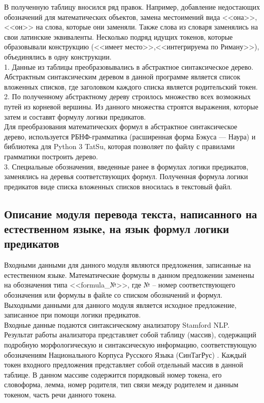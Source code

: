 \documentclass[12pt]{article}
\begin{document}
В полученную таблицу вносился ряд правок. Например, добавление недостающих обозначений для математических объектов, замена местоимений вида <<она>>,<<он>> на слова, которые они заменяли. Также слова из словаря заменялись на свои латинские эквиваленты. Несколько подряд идущих токенов, которые образовывали конструкцию (<<имеет место>>,<<интегрируема по Риману>>), объединялись в одну конструкции.\\

1. Данные из таблицы преобразовывались в абстрактное синтаксическое дерево. Абстрактным синтаксическим деревом в данной программе является список вложенных списков, где заголовком каждого списка является родительский токен. \\

2. По полученному абстрактному дереву строилось множество всех возможных путей из корневой вершины. Из данного множества строятся выражения, которые затем и составят формулу логики предикатов. \\

Для преобразования математических формул в абстрактное синтаксическое дерево, используется РБНФ-грамматика (расширенная форма Бэкуса — Наура) и библиотека для Python 3 TatSu, которая позволяет по файлу с правилами грамматики построить дерево. \\

3. Специальные обозначения, введенные ранее в формулах логики предикатов, заменялись на деревья соответствующих формул. Полученная формула логики предикатов виде списка вложенных списков вносилась в текстовый файл.  \\
 
\newpage
\subsection{Описание модуля перевода текста, написанного на естественном языке, на язык формул логики предикатов}
Входными данными для данного модуля являются предложения, записанные на естественном языке.  Математические формулы в данном предложении заменены на обозначения типа <<formula\_№>>, где № -- номер соответствующего обозначения или формулы в файле со списком обозначений и формул. Выходными данными для данного модуля является исходное предложение, записанное при помощи логики предикатов.\\

Входные данные подаются синтаксическому анализатору Stamford NLP. Результат работы анализатора представляет собой  таблицу (массив), содержащий подробную морфологическую и синтаксическую информацию, соответствующую обозначениям Национального Корпуса Русского Языка (СинТагРус) \cite{author17}.
Каждый токен входного предложения представляет собой отдельный массив в данной таблице. В данном массиве содержится порядковый номер токена, его словоформа, лемма, номер родителя, тип связи между родителем и данным токеном, часть речи данного токена. \\
\end{document}
